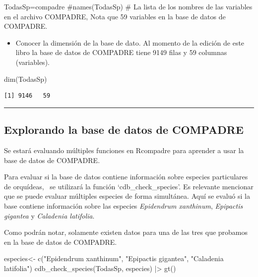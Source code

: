 \documentclass[
  12pt,
  letterpaper,
]{book}
\newenvironment{Shaded}{\begin{snugshade}}{\end{snugshade}}
\newcommand{\CommentTok}[1]{\textcolor[rgb]{0.37,0.37,0.37}{#1}}
\newcommand{\FunctionTok}[1]{\textcolor[rgb]{0.28,0.35,0.67}{#1}}
\newcommand{\NormalTok}[1]{\textcolor[rgb]{0.00,0.23,0.31}{#1}}
\newcommand{\OtherTok}[1]{\textcolor[rgb]{0.00,0.23,0.31}{#1}}
\newcommand{\SpecialCharTok}[1]{\textcolor[rgb]{0.37,0.37,0.37}{#1}}
\newcommand{\StringTok}[1]{\textcolor[rgb]{0.13,0.47,0.30}{#1}}
\providecommand{\tightlist}{%
  \setlength{\itemsep}{0pt}\setlength{\parskip}{0pt}}\usepackage{longtable,booktabs,array}
\begin{document}
\begin{Shaded}
\begin{Highlighting}[]
\NormalTok{TodasSp}\OtherTok{=}\NormalTok{compadre}
\CommentTok{\#names(TodasSp) \# La lista de los nombres de las variables en el archivo COMPADRE, Nota que 59 variables en la base de datos de COMPADRE.}
\end{Highlighting}
\end{Shaded}

\begin{itemize}
\tightlist
\item
  Conocer la dimensión de la base de dato. Al momento de la edición de
  este libro la base de datos de COMPADRE tiene 9149 filas y 59 columnas
  (variables).
\end{itemize}

\begin{Shaded}
\begin{Highlighting}[]
\FunctionTok{dim}\NormalTok{(TodasSp) }
\end{Highlighting}
\end{Shaded}

\begin{verbatim}
[1] 9146   59
\end{verbatim}

\begin{center}\rule{0.5\linewidth}{0.5pt}\end{center}

\subsection{Explorando la base de datos de
COMPADRE}\label{explorando-la-base-de-datos-de-compadre}

Se estará evaluando múltiples funciones en Rcompadre para aprender a
usar la base de datos de COMPADRE.

Para evaluar si la base de datos contiene información sobre especies
particulares de orquídeas, ~se utilizará la función
`cdb\_check\_species'. Es relevante mencionar que se puede evaluar
múltiples especies de forma simultánea. Aquí se evaluó si la base
contiene información sobre las especies \emph{Epidendrum xanthinum},
\emph{Epipactis gigantea} y \emph{Caladenia latifolia}.

Como podrán notar, solamente existen datos para una de las tres que
probamos en la base de datos de COMPADRE.

\begin{Shaded}
\begin{Highlighting}[]
\NormalTok{especies}\OtherTok{\textless{}{-}} \FunctionTok{c}\NormalTok{(}\StringTok{"Epidendrum xanthinum"}\NormalTok{, }\StringTok{"Epipactis gigantea"}\NormalTok{, }\StringTok{"Caladenia latifolia"}\NormalTok{)}
\FunctionTok{cdb\_check\_species}\NormalTok{(TodasSp, especies) }\SpecialCharTok{|\textgreater{}} \FunctionTok{gt}\NormalTok{()}
\end{Highlighting}
\end{Shaded}
\end{document}
